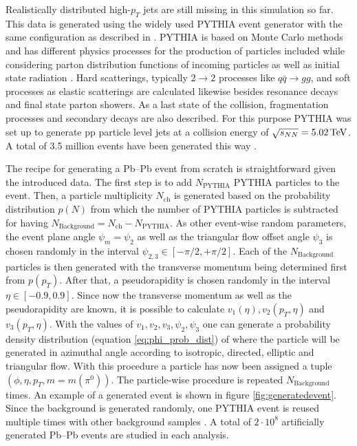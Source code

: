 \documentclass[
  a4paper,
  12pt,
  oneside,
  parskip=half,
  listof=totoc,
  bibliography=totoc,
  DIV=12,
  numbers=noenddot,
  BA.tex
  ]{subfiles}
\begin{document}
Realistically distributed high-$p_T$ jets are still missing in this simulation so far. This data is generated using the widely used PYTHIA \cite{noauthor_pythia_nodate} event generator with the same configuration as described in \cite{nadine_alice_grunwald_studies_2022}. PYTHIA is based on Monte Carlo methods and has different physics processes for the production of particles included while considering parton distribution functions of incoming particles as well as initial state radiation \cite{noauthor_pythia_nodate}. Hard scatterings, typically $2 \rightarrow 2$ processes like $q\bar{q} \rightarrow gg$, and soft processes as elastic scatterings are calculated likewise besides resonance decays and final state parton showers. As a last state of the collision, fragmentation processes and secondary decays are also described. For this purpose PYTHIA was set up to generate pp particle level jets at a collision energy of $\sqrt{s_{NN}} = 5.02\bunit{TeV}$. A total of 3.5 million events have been generated this way \cite{nadine_alice_grunwald_studies_2022}. 

The recipe for generating a Pb--Pb event from scratch is straightforward given the introduced data. The first step is to add $N_\text{PYTHIA}$ PYTHIA particles to the event. Then, a particle multiplicity $N_\text{ch}$ is generated based on the probability distribution $p(N)$ from which the number of PYTHIA particles is subtracted for having $N_\text{Background} = N_\text{ch} - N_\text{PYTHIA}$. As other event-wise random parameters, the event plane angle $\psi_m = \psi_2$ as well as the triangular flow offset angle $\psi_3$ is chosen randomly in the interval $\psi_{2,3} \in [-\pi/2, +\pi/2]$. Each of the $N_\text{Background}$ particles is then generated with the transverse momentum being determined first from $p(p_T)$. After that, a pseudorapidity is chosen randomly in the interval $\eta \in [-0.9, 0.9]$. Since now the transverse momentum as well as the pseudorapidity are known, it is possible to calculate $v_1(\eta), v_2(p_T, \eta)$ and $v_3(p_T, \eta)$. With the values of $v_1, v_2, v_3, \psi_2, \psi_3$ one can generate a probability density distribution (equation \ref{eq:phi_prob_dist}) of where the particle will be generated in azimuthal angle according to isotropic, directed, elliptic and triangular flow. With this procedure a particle has now been assigned a tuple $(\phi, \eta, p_T, m=m(\pi^0))$. The particle-wise procedure is repeated $N_\text{Background}$ times. An example of a generated event is shown in figure \ref{fig:generatedevent}. Since the background is generated randomly, one PYTHIA event is reused multiple times with other background samples \cite{noauthor_pythia_nodate}. A total of $2 \cdot 10^8$ artificially generated Pb--Pb events are studied in each analysis.
\end{document}
